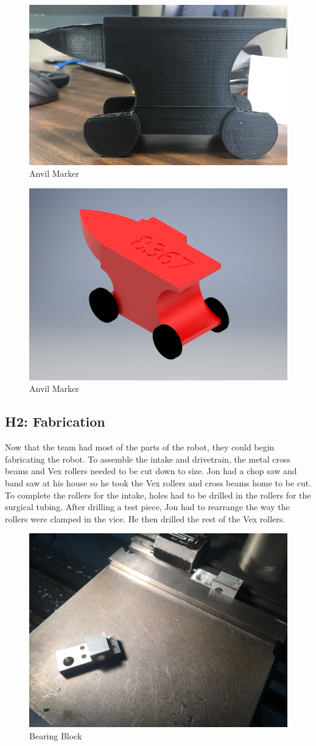 \documentclass{article}
\begin{document}
\begin{figure}
    \centering
    \includegraphics[width=.6 \textwidth]{09_10-29/images/anvil_marker.jpg}
    \caption{Anvil Marker}
    \label{fig:marker}
\end{figure}

\begin{figure}
    \centering
    \includegraphics[width=.6 \textwidth]{09_10-29/images/REAL_anvil_marker[1].png}
    \caption{Anvil Marker}
    \label{fig:marker}
\end{figure}

\subsection{H2: Fabrication}

Now that the team had most of the parts of the robot, they could begin fabricating the robot. To assemble the intake and drivetrain, the metal cross beams and Vex rollers needed to be cut down to size. Jon had a chop saw and band saw at his house so he took the Vex rollers and cross beams home to be cut. To complete the rollers for the intake, holes had to be drilled in the rollers for the surgical tubing. After drilling a test piece, Jon had to rearrange the way the rollers were clamped in the vice. He then drilled the rest of the Vex rollers.

\begin{figure}
    \centering
    \includegraphics[width=.6 \textwidth]{09_10-29/images/bearingblock.JPG}
    \caption{Bearing Block}
    \label{fig:bearingblock}
\end{figure}
\end{document}
